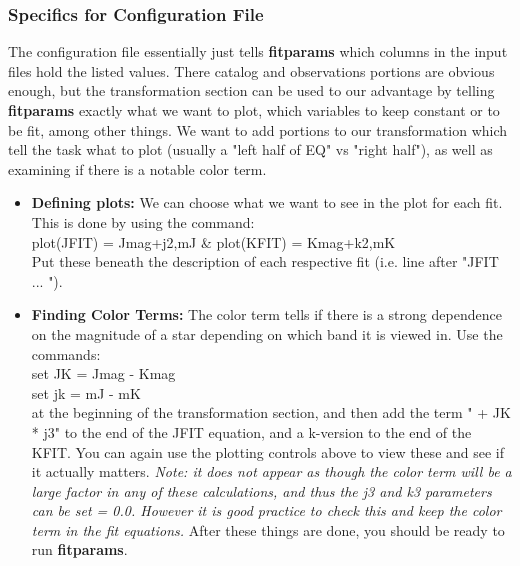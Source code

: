 \documentclass[a4paper]{article}
\begin{document}
\subsubsection{Specifics for Configuration File}
The configuration file essentially just tells \textbf{fitparams} which columns in the input files hold the listed values.  There catalog and observations portions are obvious enough, but the transformation section can be used to our advantage by telling \textbf{fitparams} exactly what we want to plot, which variables to keep constant or to be fit, among other things.  We want to add portions to our transformation which tell the task what to plot (usually a "left half of EQ" vs "right half"), as well as examining if there is a notable color term.  
\begin{itemize}
\item \textbf{Defining plots:} We can choose what we want to see in the plot for each fit.  This is done by using the command: \\
plot(JFIT) = Jmag+j2,mJ   \&   plot(KFIT) = Kmag+k2,mK \\
Put these beneath the description of each respective fit (i.e. line after "JFIT ... ").
\item \textbf{Finding Color Terms:} The color term tells if there is a strong dependence on the magnitude of a star depending on which band it is viewed in.  Use the commands: \\
set JK = Jmag - Kmag \\
set jk = mJ - mK \\
at the beginning of the transformation section, and then add the term " + JK * j3" to the end of the JFIT equation, and a k-version to the end of the KFIT.  You can again use the plotting controls above to view these and see if it actually matters.  \textit{Note: it does not appear as though the color term will be a large factor in any of these calculations, and thus the j3 and k3 parameters can be set = 0.0.  However it is good practice to check this and keep the color term in the fit equations.}  After these things are done, you should be ready to run \textbf{fitparams}.
\end{itemize}
\end{document}
